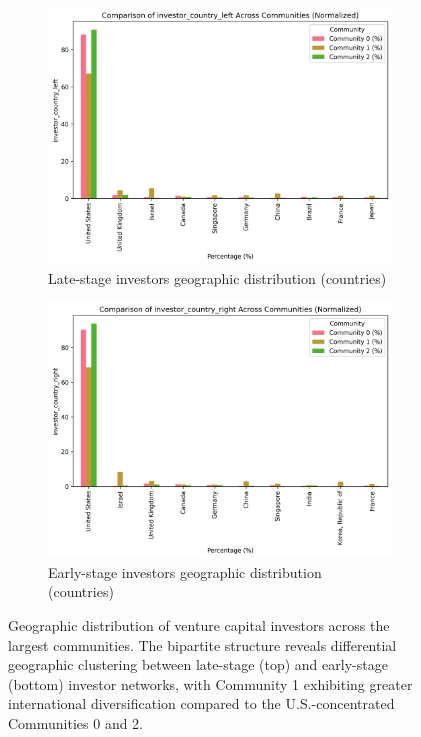 \begin{figure}[htp]
\centering
\begin{subfigure}{0.8\textwidth}
    \centering
    \includegraphics[width=1\textwidth]{../figures/us/categorical_comparison_investor_country_left.png}
    \caption{Late-stage investors geographic distribution (countries)}
    \label{fig:late_stage_geo}
\end{subfigure}

\vspace{0.5em}

\begin{subfigure}{0.8\textwidth}
    \centering
    \includegraphics[width=1\textwidth]{../figures/us/categorical_comparison_investor_country_right.png}
    \caption{Early-stage investors geographic distribution (countries)}
    \label{fig:early_stage_geo}
\end{subfigure}
\caption{Geographic distribution of venture capital investors across the largest communities. The bipartite structure reveals differential geographic clustering between late-stage (top) and early-stage (bottom) investor networks, with Community 1 exhibiting greater international diversification compared to the U.S.-concentrated Communities 0 and 2.}
\label{fig:geographic_distribution}
\end{figure}

